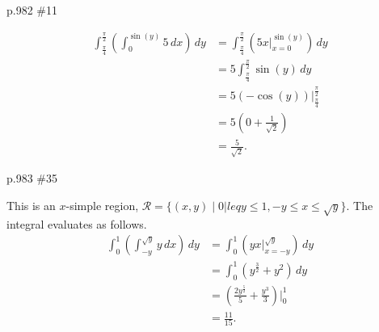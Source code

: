 \begin{practice}p.982 \#11\end{practice}
\begin{pracsol}
  \[\begin{split}
    \int_{\frac{\pi}4}^{\frac{\pi}2}\left(\int_0^{\sin(y)}5\,dx\right)\,dy &= \int_{\frac{\pi}4}^{\frac{\pi}2}\left(5x\Big|_{x=0}^{\sin(y)}\right)\,dy \\
    &= 5\int_{\frac{\pi}{4}}^{\frac{\pi}{2}}\sin(y)\,dy\\
    &= 5(-\cos(y))\Big|_{\frac{\pi}4}^{\frac{\pi}2}\\
    &= 5\left(0+\frac{1}{\sqrt2}\right)\\
    &= \frac{5}{\sqrt2}.
  \end{split}\]
\end{pracsol}
\begin{practice}p.983 \#35\end{practice}
\begin{pracsol}
  This is an $x$-simple region, $\mathcal R=\{(x,y)\mid 0|leq y\leq 1,-y\leq x\leq \sqrt y\}$. The integral evaluates as follows.
  \[\begin{split}
    \int_0^1\left(\int_{-y}^{\sqrt y} y\,dx\right)\,dy &= \int_0^1\left(yx\Big|_{x=-y}^{\sqrt y}\right)\,dy\\
    &= \int_0^1(y^{\frac32}+y^2)\,dy\\
    &= \left(\frac{2y^{\frac52}}5+\frac{y^3}{3}\right)\Big|_0^1\\
    &= \frac{11}{15}.
  \end{split}\]
\end{pracsol}

